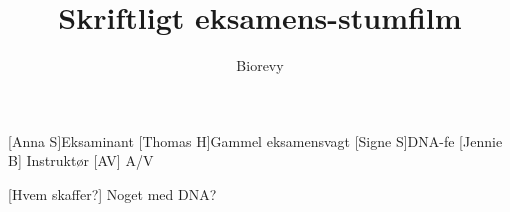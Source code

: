\documentclass[a4paper,12pt]{article}
\title{ Skriftligt eksamens-stumfilm}
\author{Biorevy}
\begin{document}
\maketitle




\begin{roles}
	[Anna S]Eksaminant
	[Thomas H]Gammel eksamensvagt
	[Signe S]DNA-fe
	[Jennie B] Instruktør
[AV] A/V	
\end{roles}


\begin{props}
	[Hvem skaffer?] Noget med DNA?
\end{props}
\end{document}
